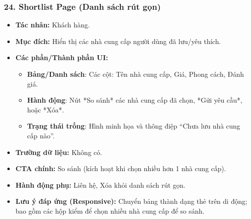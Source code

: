 \documentclass[11pt,a4paper]{article}
\begin{document}
\subsubsection{24. Shortlist Page (Danh sách rút gọn)}
\begin{itemize}
    \item \textbf{Tác nhân:} Khách hàng.
    \item \textbf{Mục đích:} Hiển thị các nhà cung cấp người dùng đã lưu/yêu thích.
    \item \textbf{Các phần/Thành phần UI:}
    \begin{itemize}
        \item \textbf{Bảng/Danh sách}: Các cột: Tên nhà cung cấp, Giá, Phong cách, Đánh giá.
        \item \textbf{Hành động}: Nút *So sánh* các nhà cung cấp đã chọn, *Gửi yêu cầu*, hoặc *Xóa*.
        \item \textbf{Trạng thái trống}: Hình minh họa và thông điệp ``Chưa lưu nhà cung cấp nào''.
    \end{itemize}
    \item \textbf{Trường dữ liệu:} Không có.
    \item \textbf{CTA chính:} So sánh (kích hoạt khi chọn nhiều hơn 1 nhà cung cấp).
    \item \textbf{Hành động phụ:} Liên hệ, Xóa khỏi danh sách rút gọn.
    \item \textbf{Lưu ý đáp ứng (Responsive):} Chuyển bảng thành dạng thẻ trên di động; bao gồm các hộp kiểm để chọn nhiều nhà cung cấp để so sánh.
\end{itemize}
\end{document}
